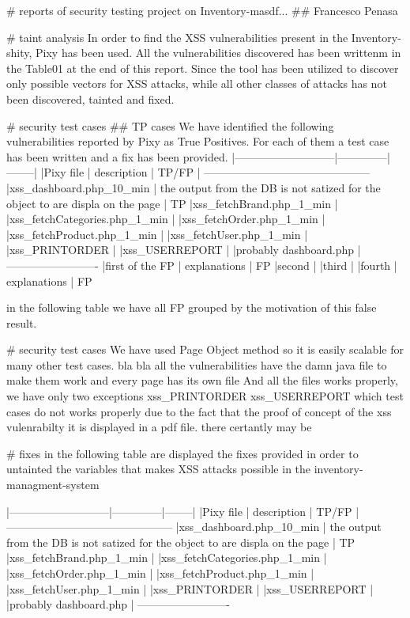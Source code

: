# reports of security testing project on Inventory-masdf...
## Francesco Penasa

# taint analysis
In order to find the XSS vulnerabilities present in the Inventory-shity, Pixy has been used.
All the vulnerabilities discovered has been writtenm in the Table01 at the end of this report.
Since the tool has been utilized to discover only possible vectors for XSS attacks, while all other classes of attacks has not been discovered, tainted and fixed. 

# security test cases
## TP cases
We have identified the following vulnerabilities reported by Pixy as True Positives. For each of them a test case has been written and a fix has been provided.
|---------------------------|--------------|--------|
|Pixy file					| description  | TP/FP	|
---------------------------------------------
|xss_dashboard.php_10_min		| the output from the DB is not satized for the object to are displa on 									the page | TP  
|xss_fetchBrand.php_1_min		|
|xss_fetchCategories.php_1_min	|
|xss_fetchOrder.php_1_min		|
|xss_fetchProduct.php_1_min		|
|xss_fetchUser.php_1_min		|
|xss_PRINTORDER					|
|xss_USERREPORT					|
|probably dashboard.php			|
-------------------------
|first of the FP 				| explanations | FP
|second 						|
|third							|
|fourth							| explanations | FP




in the following table we have all FP grouped by the motivation of this false result.

# security test cases
We have used Page Object method so it is easily scalable for many other test cases.
bla bla
all the vulnerabilities have the damn java file to make them work and every page has its own file
And all the files works properly, we have only two exceptions xss_PRINTORDER xss_USERREPORT which test cases do not works properly due to the fact that the proof of concept of the xss vulenrabilty it is displayed in a pdf file. there certantly may be

# fixes 
in  the following table are displayed the fixes provided in order to untainted the variables that makes XSS attacks possible in the inventory-managment-system

|---------------------------|--------------|--------|
|Pixy file					| description  | TP/FP	|
---------------------------------------------
|xss_dashboard.php_10_min		| the output from the DB is not satized for the object to are displa on 									the page | TP  
|xss_fetchBrand.php_1_min		|
|xss_fetchCategories.php_1_min	|
|xss_fetchOrder.php_1_min		|
|xss_fetchProduct.php_1_min		|
|xss_fetchUser.php_1_min		|
|xss_PRINTORDER					|
|xss_USERREPORT					|
|probably dashboard.php			|
-------------------------

